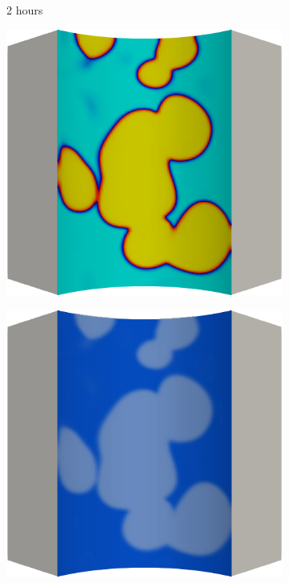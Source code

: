 \begin{figure}[!htbp]
  \begin{subfigure}{0.15\textwidth}
    \centering
    \caption*{2 hours}
  \end{subfigure}
  \begin{subfigure}{0.19\textwidth}
    \centering
    \includegraphics[width=\textwidth]{Chapter5/figures/spallation/c.0024}
  \end{subfigure}
  \hspace{0.06\textwidth}
  \begin{subfigure}{0.19\textwidth}
    \centering
    \includegraphics[width=\textwidth]{Chapter5/figures/spallation/d.0024}

\end{subfigure}
\end{figure}
